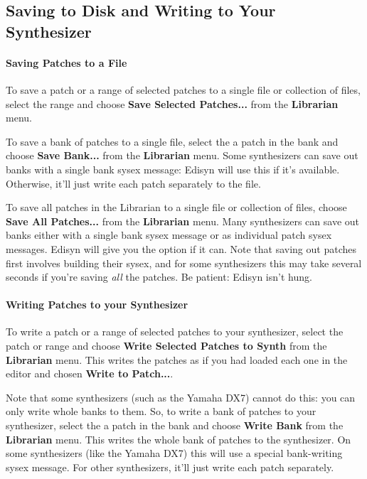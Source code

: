 \documentclass{article}
\begin{document}
\subsection{Saving to Disk and Writing to Your Synthesizer} 

\paragraph{Saving Patches to a File}

To save a patch or a range of selected patches to a single file or collection of files, select the range and choose {\bf Save Selected Patches...} from the {\bf Librarian} menu.

To save a bank of patches to a single file, select the a patch in the bank and choose {\bf Save Bank...} from the {\bf Librarian} menu.  Some synthesizers can save out banks with a single bank sysex message: Edisyn will use this if it's available. Otherwise, it'll just write each patch separately to the file.

To save all patches in the Librarian  to a single file or collection of files, choose {\bf Save All Patches...} from the {\bf Librarian} menu.  Many synthesizers can save out banks either with a single bank sysex message or as individual patch sysex messages.  Edisyn will give you the option if it can.  Note that saving out patches first involves building their sysex, and for some synthesizers this may take several seconds if you're saving {\it all} the patches.  Be patient: Edisyn isn't hung.

\paragraph{Writing Patches to your Synthesizer}

To write a patch or a range of selected patches to your synthesizer, select the patch or range and choose {\bf Write Selected Patches to Synth} from the {\bf Librarian} menu.  This writes the patches as if you had loaded each one in the editor and chosen {\bf Write to Patch...}.  

Note that some synthesizers (such as the Yamaha DX7) cannot do this: you can only write whole banks to them.  So, to write a bank of patches to your synthesizer, select the a patch in the bank and choose {\bf Write Bank} from the {\bf Librarian} menu.  This writes the whole bank of patches to the synthesizer.  On some synthesizers (like the Yamaha DX7) this will use a special bank-writing sysex message. For other synthesizers, it'll just write each patch separately.
\end{document}
